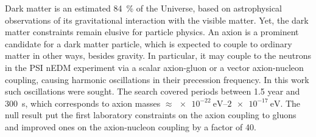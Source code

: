 Dark matter is an estimated \SI{84}{\percent} of the Universe, based on astrophysical observations of its gravitational interaction with the visible matter. Yet, the dark matter constraints remain elusive for particle physics. An axion is a prominent candidate for a dark matter particle, which is expected to couple to ordinary matter in other ways, besides gravity. In particular, it may couple to the neutrons in the PSI nEDM experiment via a scalar axion-gluon or a vector axion-nucleon coupling, causing harmonic oscillations in their precession frequency. In this work such oscillations were sought. The search covered periods between 1.5 year and \SI{300}{\second}, which corresponds to axion masses $\approx \SIrange[range-phrase=--]{e-22}{2e-17}{\electronvolt}$. The null result put the first laboratory constraints on the axion coupling to gluons and improved ones on the axion-nucleon coupling by a factor of 40.

\enlargethispage{2\baselineskip}

\endgroup			

\vfill
